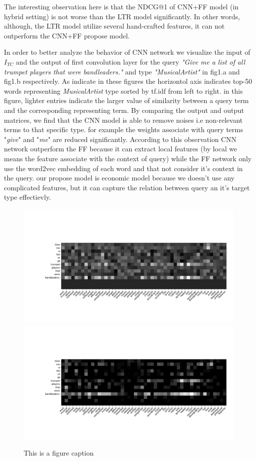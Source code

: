 The interesting observation here is that the NDCG@1 of CNN+FF model (in hybrid setting) is not worse than the LTR model significantly. In other words, although, the LTR model utilize several hand-crafted features, it can not outperform the CNN+FF propose model.

In order to better analyze the behavior of CNN network we visualize the input of $I_{TC}$ and the output of first convolution layer for the query \textit{"Give me a list of all trumpet players that were bandleaders."} and type \textit{"MusicalArtist"} in fig1.a and fig1.b respectively. As indicate in these figures the horizontol axis indicates top-50 words representing \textit{MusicalArtist} type sorted by tf.idf from left to right. in this figure, lighter entries indicate the larger value of similarity between a query term and the corresponding representing term. By comparing the output and output matrices, we find that the CNN model is able to remove noises i.e non-relevant terms to that specific type. for example the weights associate with query terms "\textit{give}" and "\textit{me}" are reduced significantly. According to this observation CNN network outperform the FF because it can extract local features (by local we means the feature associate with the context of query) while the FF network only use the word2vec embedding of each word and that not consider it's context in the query. our propose model is economic model because we doesn't use any complicated features, but it can capture the relation between query an it's target type effectievly. 	

\begin{figure}
	\includegraphics[width=\textwidth]{leaders_input.pdf}
	\includegraphics[width=\textwidth]{leaders_out.pdf}
	\caption{This is a figure caption}
\end{figure}



